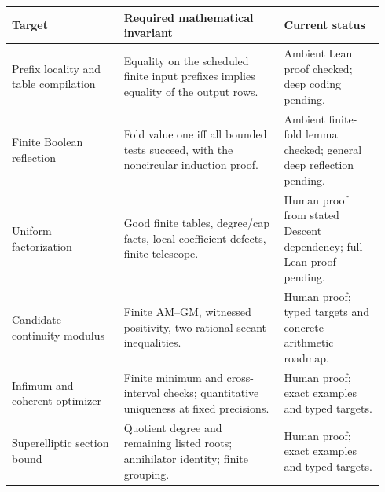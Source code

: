 \begin{longtable}{@{}>{\raggedright\arraybackslash}p{0.29\linewidth}>{\raggedright\arraybackslash}p{0.40\linewidth}>{\raggedright\arraybackslash}p{0.25\linewidth}@{}}
\toprule
Target & Required mathematical invariant & Current status\\
\midrule
\endhead
Prefix locality and table compilation & Equality on the scheduled
finite input prefixes implies equality of the output rows. & Ambient
Lean proof checked; deep coding pending.\\[4pt]
Finite Boolean reflection & Fold value one iff all bounded tests
succeed, with the noncircular induction proof. & Ambient finite-fold
lemma checked; general deep reflection pending.\\[4pt]
Uniform factorization & Good finite tables, degree/cap facts, local
coefficient defects, finite telescope. & Human proof from stated
Descent dependency; full Lean proof pending.\\[4pt]
Candidate continuity modulus & Finite AM--GM, witnessed positivity,
two rational secant inequalities. & Human proof; typed targets and
concrete arithmetic roadmap.\\[4pt]
Infimum and coherent optimizer & Finite minimum and cross-interval
checks; quantitative uniqueness at fixed precisions. & Human proof;
exact examples and typed targets.\\[4pt]
Superelliptic section bound & Quotient degree and remaining listed
roots; annihilator identity; finite grouping. & Human proof;
exact examples and typed targets.\\
\bottomrule
\end{longtable}
